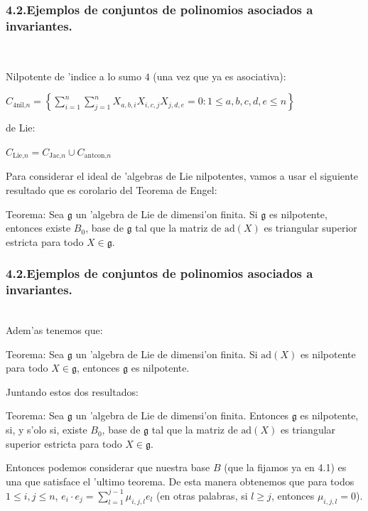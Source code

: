 \documentclass[10pt]{beamer}
\begin{document}
\begin{frame}
\frametitle{4.2.Ejemplos de conjuntos de polinomios asociados a invariantes.}\\
\begin{block}{Nilpotente de 'indice a lo sumo $4$ (una vez que ya es asociativa):}\\
\begin{center}
$C_{\text{4nil,}n}= \displaystyle \left \{\sum_{i=1}^{n}\sum_{j=1}^n X_{a,b,i} X_{i,c,j} X_{j,d,e}=0:1\leq a,b,c,d,e \leq n \right \}$\\
\end{center}
\end{block}

\begin{block}{de Lie:}\\
\begin{center}
$C_{\text{Lie,}n}= C_{\text{Jac,}n} \cup C_{\text{antcon,}n}$\\
\end{center}
\end{block}

Para considerar el ideal de 'algebras de Lie nilpotentes, vamos a usar el siguiente resultado que es corolario del Teorema de Engel:\\

\begin{block}{Teorema:}
Sea $\mathfrak{g}$ un 'algebra de Lie de dimensi'on finita. Si $\mathfrak{g}$ es nilpotente, entonces existe $B_0$, base de $\mathfrak{g}$ tal que la matriz de $\text{ad}(X)$ es triangular superior estricta para todo $X \in \mathfrak{g}$.\\
\end{block}
\end{frame}


\begin{frame}
\frametitle{4.2.Ejemplos de conjuntos de polinomios asociados a invariantes.}\\
Adem'as tenemos que:\\
\begin{block}{Teorema:}
Sea $\mathfrak{g}$ un 'algebra de Lie de dimensi'on finita. Si $\text{ad}(X)$ es nilpotente para todo $X \in \mathfrak{g}$, entonces $\mathfrak{g}$ es nilpotente.
\end{block}

Juntando estos dos resultados:\\

\begin{block}{Teorema:}
Sea $\mathfrak{g}$ un 'algebra de Lie de dimensi'on finita. Entonces $\mathfrak{g}$ es nilpotente, si, y s'olo si, existe $B_0$, base de $\mathfrak{g}$ tal que la matriz de $\text{ad}(X)$ es triangular superior estricta para todo $X \in \mathfrak{g}$.\\
\end{block}

Entonces podemos considerar que nuestra base $B$ (que la fijamos ya en 4.1) es una que satisface el 'ultimo teorema. De esta manera obtenemos que para todos $1 \leq i,j \leq n$, $e_i\cdot e_j=\sum_{l=1}^{j-1}{\mu _{i,j,l}e_l}$ (en otras palabras, si $l \geq j$, entonces $\mu _{i,j,l}=0$).\\
\end{frame}
\end{document}
